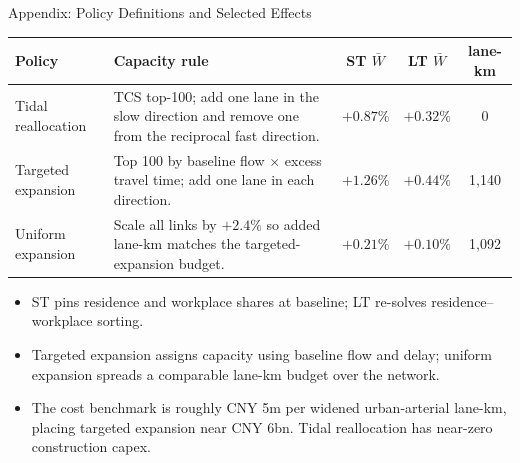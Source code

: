 \documentclass[11pt,aspectratio=169]{beamer}
\newcommand{\navback}[1]{\par\vspace{0.35em}\noindent\hfill\hyperlink{#1}{\beamerreturnbutton{back}}}
\begin{document}
\begin{frame}[label=apppolicy]{Appendix: Policy Definitions and Selected Effects}
\scriptsize
\begin{center}
\renewcommand{\arraystretch}{1.20}
\begin{tabularx}{0.96\textwidth}{@{}p{}Xccc@{}}
\toprule
Policy & Capacity rule & ST $\bar W$ & LT $\bar W$ & lane-km \\
\midrule
Tidal reallocation & TCS top-100; add one lane in the slow direction and remove one from the reciprocal fast direction. & $+0.87\%$ & $+0.32\%$ & 0 \\
Targeted expansion & Top 100 by baseline flow $\times$ excess travel time; add one lane in each direction. & $+1.26\%$ & $+0.44\%$ & 1{,}140 \\
Uniform expansion & Scale all links by $+2.4\%$ so added lane-km matches the targeted-expansion budget. & $+0.21\%$ & $+0.10\%$ & 1{,}092 \\
\bottomrule
\end{tabularx}
\end{center}
\vspace{0.35em}
\begin{itemize}\footnotesize\setlength\itemsep{0.40em}
  \item ST pins residence and workplace shares at baseline; LT re-solves residence--workplace sorting.
  \item Targeted expansion assigns capacity using baseline flow and delay; uniform expansion spreads a comparable lane-km budget over the network.
  \item The cost benchmark is roughly CNY 5m per widened urban-arterial lane-km, placing targeted expansion near CNY 6bn. Tidal reallocation has near-zero construction capex.
\end{itemize}
\navback{result4}
\end{frame}
\end{document}
